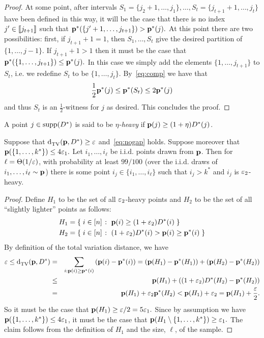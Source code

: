\begin{proof}
At some point, after intervals $S_1 = \{j_2+1,\dots,j_1\},\dots,S_t
= \{j_{t+1}+1,\dots,j_t\}$ have been defined in this way, it will be the
case that there is no index $j' \in \llbracket j_{t+1}\rrbracket$ such that
\mbox{$\mathbf{p}^\ast(\{j' + 1,\dots,j_{t+1}\}) > \mathbf{p}^\ast(j).$}
At this point there are two possibilities:  first, if $j_{t+1}+1=1$,
then $S_1,\dots,S_t$ give the desired partition of $\{1,\dots,j-1\}$.
If $j_{t+1}+1>1$ then it must be the case that
$\mathbf{p}^\ast(\{1,\dots,j_{t+1}\}) \leq \mathbf{p}^\ast(j).$
In this case we simply add the elements $\{1,\dots,j_{t+1}\}$
to $S_{t}$, i.e. we redefine $S_t$ to be
$\{1,\dots,j_t\}$.  By~\cref{eq:comp} we have that
\[
\frac{1}{2}\mathbf{p}^\ast(j) \leq \mathbf{p}^\ast(S_t) \leq 2\mathbf{p}^\ast(j)
\]
and thus $S_t$ is an ${\frac{1}2}$-\good witness for $j$ as desired. This
concludes the proof.
\end{proof}

\begin{definition}
A point $j\in\operatorname{supp}\!\left(D^\ast\right)$ is said to be \emph{$\eta$-heavy}
if \mbox{$\mathbf{p}(j) \geq (1+\eta)D^\ast(j)$}.
\end{definition}

\begin{claim}\label{claim:finding:heavy:guy}

Suppose that ${\operatorname{d}_{\textrm{TV}}^{}\!\left({\mathbf{p}, D^\ast}\right)} \geq \varepsilon$ and~\cref{eq:nogap} holds.
Suppose moreover that $\mathbf{p}(\{1,\dots,k^\ast\}) \leq 4 {\varepsilon_1}.$
Let $i_1,\dots,i_\ell$ be i.i.d. points drawn from $\mathbf{p}$.
Then for $\ell = \Theta(1/\varepsilon)$, with probability at least $99/100$
(over the i.i.d. draws of $i_1,\dots,i_\ell \sim \mathbf{p}$)
there is some point $i_j \in \{i_1,\dots,i_\ell\}$ such that
$i_j > k^\ast$ and $i_j$ is ${\varepsilon_2}$-heavy.
\end{claim}
\begin{proof}
Define $H_1$ to be the set of all ${\varepsilon_2}$-heavy points and $H_2$ to be the
set of all ``slightly lighter'' points as follows:
\begin{align*}
H_1 &= \left\{\;  i\in [n]  \;\colon\;  \mathbf{p}(i) \geq (1+{\varepsilon_2})D^\ast(i) \; \right\} \\
H_2 &= \left\{\;  i\in [n]  \;\colon\;  (1+{\varepsilon_2})D^\ast(i) > \mathbf{p}(i) \geq \mathbf{p}^\ast(i)  \; \right\}
\end{align*}
By definition of the total variation distance, we have
\begin{eqnarray*}
\varepsilon \leq {\operatorname{d}_{\textrm{TV}}^{}\!\left({\ensuremath{\mathbf{p}}, D^\ast}\right)}
&=& \sum_{i : \mathbf{p}(i) \geq \mathbf{p}^\ast(i)} \left( \mathbf{p}(i) - \mathbf{p}^\ast(i) \right) =  \left( \mathbf{p}(H_1)-\mathbf{p}^\ast(H_1) \right)
+ \left( \mathbf{p}(H_2)-\mathbf{p}^\ast(H_2) \right) \\
&\leq& \mathbf{p}(H_1) + \left( (1+{\varepsilon_2})D^\ast (H_2)-\mathbf{p}^\ast(H_2) \right) \\
&=& \mathbf{p}(H_1) + {\varepsilon_2} \mathbf{p}^\ast(H_2)
< \mathbf{p}(H_1) + {\varepsilon_2} = \mathbf{p}(H_1) + {\frac{\varepsilon}2}.
\end{eqnarray*}
So it must be the case that $\mathbf{p}(H_1) \geq \varepsilon/2 = 5 {\varepsilon_1}.$  Since by assumption we have $\mathbf{p}(\{1,\dots,k^\ast\}) \leq 4 {\varepsilon_1}$, it must be the case that $\D(H_1 \setminus \{1,\dots,k^\ast\}) \geq  {\eps_1}.$ The claim follows from the definition of $H_1$ and the size, $\ell$, of the sample.
\end{proof}


